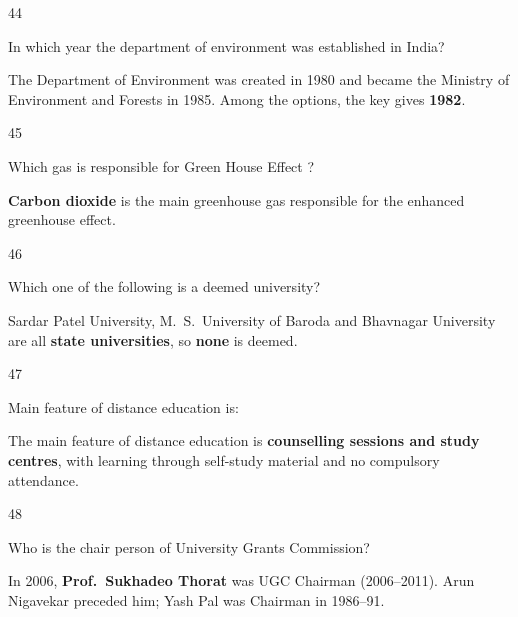 \begin{question}{44}
{In which year the department of environment was established in India?\par}
\begin{explain}
The Department of Environment was created in 1980 and became the Ministry of Environment and Forests in 1985. Among the options, the key gives \textbf{1982}.
\end{explain}
\end{question}

\begin{question}{45}
{Which gas is responsible for Green House Effect ?\par}
\begin{explain}
\textbf{Carbon dioxide} is the main greenhouse gas responsible for the enhanced greenhouse effect.
\end{explain}
\end{question}

\begin{question}{46}
{Which one of the following is a deemed university?\par}
\begin{explain}
Sardar Patel University, M.~S.~University of Baroda and Bhavnagar University are all \textbf{state universities}, so \textbf{none} is deemed.
\end{explain}
\end{question}

\begin{question}{47}
{Main feature of distance education is:\par}
\begin{explain}
The main feature of distance education is \textbf{counselling sessions and study centres}, with learning through self-study material and no compulsory attendance.
\end{explain}
\end{question}

\begin{question}{48}
{Who is the chair person of University Grants Commission?\par}
\begin{explain}
In 2006, \textbf{Prof.\ Sukhadeo Thorat} was UGC Chairman (2006--2011). Arun Nigavekar preceded him; Yash Pal was Chairman in 1986--91.
\end{explain}
\end{question}

